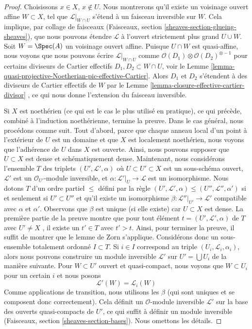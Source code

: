 \begin{proof}
Choisissons  $x \in X$,  $x \not \in U$. Nous montrerons qu'il existe un voisinage
ouvert affine  $W \subset X$, tel que  $\mathcal{L}|_{W \cap U}$  s'étend à un faisceau inversible
sur  $W$. Cela implique, par collage de faisceaux (Faisceaux, section
 \ref{sheaves-section-glueing-sheaves}), que nous pouvons étendre  $\mathcal{L}$  à l'ouvert strictement plus
grand  $U \cup W$. Soit  $W = \Spec(A)$  un voisinage ouvert affine. Puisque
 $U \cap W$  est quasi-affine, nous voyons que nous pouvons écrire  $\mathcal{L}|_{W \cap U}$ 
comme  $\mathcal{O}(D_1) \otimes \mathcal{O}(D_2)^{\otimes -1}$  pour certains diviseurs de Cartier effectifs  $D_1, D_2 \subset W \cap U$, voir
le Lemme  \ref{lemma-quasi-projective-Noetherian-pic-effective-Cartier}. Alors  $D_1$  et  $D_2$  s'étendent à des
diviseurs de Cartier effectifs de  $W$  par le Lemme  \ref{lemma-closure-effective-cartier-divisor} , ce qui
nous donne l'extension du faisceau inversible.

\medskip\noindent
Si  $X$  est noethérien (ce qui est le cas le plus utilisé en pratique), ce
qui précède, combiné à l'induction noethérienne, termine la preuve. Dans le cas
général, nous procédons comme suit. Tout d'abord, parce que chaque anneau local
d'un point à l'extérieur de  $U$  est un domaine et que  $X$  est
localement noethérien, nous voyons que l'adhérence de  $U$  dans
 $X$  est ouverte. Ainsi, nous pouvons supposer que  $U \subset X$  est dense
et schématiquement dense. Maintenant, nous considérons l'ensemble  $T$  des
triplets  $(U', \mathcal{L}', \alpha)$  où  $U \subset U' \subset X$  est un sous-schéma ouvert,  $\mathcal{L}'$  est
un  $\mathcal{O}_{U'}$-module inversible, et  $\alpha : \mathcal{L}'|_U \to \mathcal{L}$  est un isomorphisme. Nous
dotons  $T$  d'un ordre partiel  $\leq$  défini par la règle
 $(U', \mathcal{L}', \alpha) \leq (U'', \mathcal{L}'', \alpha')$  si et seulement si  $U' \subset U''$  et qu'il existe un isomorphisme
 $\beta : \mathcal{L}''|_{U'} \to \mathcal{L}'$  compatible avec  $\alpha$  et  $\alpha'$. Observons que
 $\beta$  est unique (si elle existe) car  $U \subset X$  est dense. La première
partie de la preuve montre que pour tout élément  $t = (U', \mathcal{L}', \alpha)$  de  $T$  avec
 $U' \not = X$ , il existe un  $t' \in T$  avec  $t' > t$. Ainsi, pour terminer la
preuve, il suffit de montrer que le lemme de Zorn s'applique. Considérons donc un
sous-ensemble totalement ordonné  $I \subset T$. Si  $i \in I$  correspond au
triple  $(U_i, \mathcal{L}_i, \alpha_i)$, alors nous pouvons construire un module inversible
 $\mathcal{L}'$  sur  $U' = \bigcup U_i$  de la manière suivante. Pour  $W \subset U'$  ouvert et
quasi-compact, nous voyons que  $W \subset U_i$  pour un certain  $i$  et nous
posons
$$
\mathcal{L}'(W) = \mathcal{L}_i(W)
$$
Comme applications de transition, nous utilisons les  $\beta$  (qui sont uniques
et se composent donc correctement). Cela définit un
 $\mathcal{O}$-module inversible $\mathcal{L}'$ sur la base des ouverts quasi-compacts
de $U'$, ce qui suffit à définir un module inversible (Faisceaux,
section  \ref{sheaves-section-bases}). Nous omettons les détails.
\end{proof}

